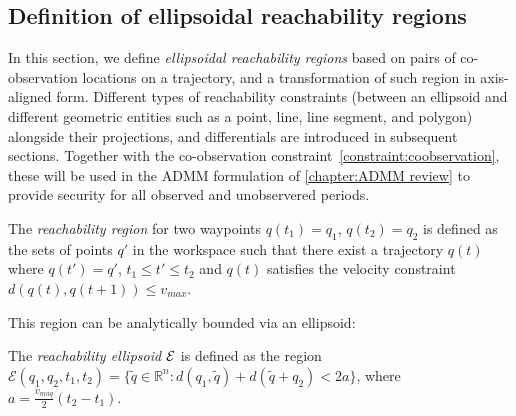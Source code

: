 \documentclass[10pt,twocolumn,twoside]{IEEEtran}
\begin{document}
\subsection{Definition of ellipsoidal reachability regions}\label{sec:reachability}
In this section, we define \emph{ellipsoidal reachability regions} based on pairs of co-observation locations on a trajectory, and a transformation of such region in axis-aligned form. Different types of reachability constraints (between an ellipsoid and different geometric entities such as a point, line, line segment, and polygon) alongside their projections, and differentials are introduced in subsequent sections. Together with the co-observation constraint~\ref{constraint:coobservation}, these will be used in the ADMM formulation of \cref{chapter:ADMM review} to provide security for all observed and unobservered periods.


\begin{definition}\label{sec:ellipsoidal definition}
	The \emph{reachability region} for two waypoints $q(t_1)=q_1$, $q(t_2)=q_2$ is defined as the sets of points $q'$ in the workspace such that there exist a trajectory $q(t)$ where $q(t')=q'$, $t_1\leq t' \leq t_2$ and $q(t)$ satisfies the velocity constraint $d(q(t),q(t+1))\leq v_{max}$.
\end{definition}
This region can be analytically bounded via an ellipsoid:
\begin{definition}\label{def:Reachability}
	The \emph{reachability ellipsoid $\mathcal{E}$} is defined as the region  $\mathcal{E}(q_1,q_2,t_{1},t_{2})=\{\tilde{q}\in\mathbb{R}^n: d(q_1,\tilde{q})+d(\tilde{q}+q_2)<2a\}$, where $a=\frac{v_{maq}}{2}(t_2-t_1)$.
\end{definition}
\end{document}
